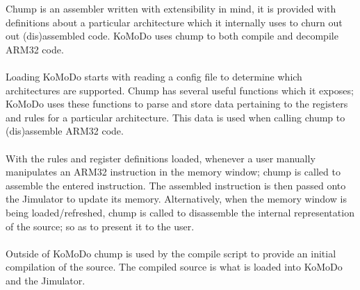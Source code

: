 %
%
%
%
%
%
%
%
Chump is an assembler written with extensibility in mind, it is provided with definitions about a particular architecture which it internally uses to churn out out (dis)assembled code. KoMoDo uses chump to both compile and decompile ARM32 code.\\\\
%
Loading KoMoDo starts with reading a config file to determine which architectures are supported. Chump has several useful functions which it exposes; KoMoDo uses these functions to parse and store data pertaining to the registers and rules for a particular architecture. This data is used when calling chump to (dis)assemble ARM32 code.\\\\
%
With the rules and register definitions loaded, whenever a user manually manipulates an ARM32 instruction in the memory window; chump is called to assemble the entered instruction. The assembled instruction is then passed onto the Jimulator to update its memory. Alternatively, when the memory window is being loaded/refreshed, chump is called to disassemble the internal representation of the source; so as to present it to the user.\\\\
%
Outside of KoMoDo chump is used by the compile script to provide an initial compilation of the source. The compiled source is what is loaded into KoMoDo and the Jimulator.
